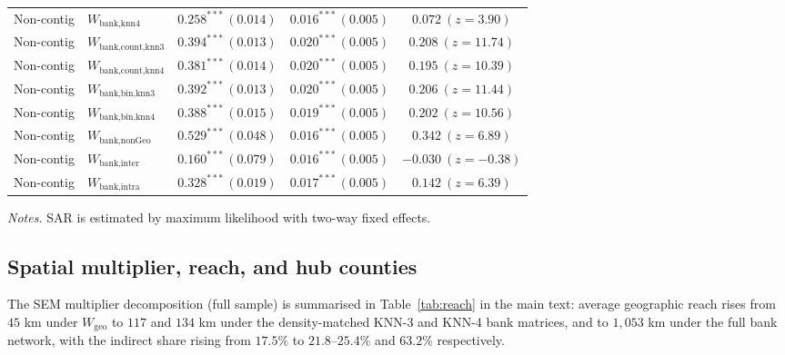 \begin{table}[htbp]
\begin{tabular}{llccc}
    Non-contig & $W_{\text{bank,knn4}}$ & $0.258^{***}\,(0.014)$ & $0.016^{***}\,(0.005)$ & $0.072\ (z{=}3.90)$ \\
    Non-contig & $W_{\text{bank,count,knn3}}$ & $0.394^{***}\,(0.013)$ & $0.020^{***}\,(0.005)$ & $0.208\ (z{=}11.74)$ \\
    Non-contig & $W_{\text{bank,count,knn4}}$ & $0.381^{***}\,(0.014)$ & $0.020^{***}\,(0.005)$ & $0.195\ (z{=}10.39)$ \\
    Non-contig & $W_{\text{bank,bin,knn3}}$ & $0.392^{***}\,(0.013)$ & $0.020^{***}\,(0.005)$ & $0.206\ (z{=}11.44)$ \\
    Non-contig & $W_{\text{bank,bin,knn4}}$ & $0.388^{***}\,(0.015)$ & $0.019^{***}\,(0.005)$ & $0.202\ (z{=}10.56)$ \\
    Non-contig & $W_{\text{bank,nonGeo}}$ & $0.529^{***}\,(0.048)$ & $0.016^{***}\,(0.005)$ & $0.342\ (z{=}6.89)$ \\
    Non-contig & $W_{\text{bank,inter}}$ & $0.160^{***}\,(0.079)$ & $0.016^{***}\,(0.005)$ & $-0.030\ (z{=}-0.38)$ \\
    Non-contig & $W_{\text{bank,intra}}$ & $0.328^{***}\,(0.019)$ & $0.017^{***}\,(0.005)$ & $0.142\ (z{=}6.39)$ \\
    \bottomrule
  \end{tabular}
  \begin{tablenotes}\footnotesize
  \item \emph{Notes.} SAR is estimated by maximum likelihood with two-way fixed effects.
  \end{tablenotes}
\end{table}

\clearpage
 
\subsection{Spatial multiplier, reach, and hub counties}
The SEM multiplier decomposition (full sample) is summarised in
Table~\ref{tab:reach} in the main text: average geographic reach rises from
$45$ km under $W_{\text{geo}}$ to $117$ and $134$ km under the density-matched
KNN-3 and KNN-4 bank matrices, and to $1{,}053$ km under the full bank network,
with the indirect share rising from $17.5\%$ to $21.8$--$25.4\%$ and $63.2\%$
respectively.
 
